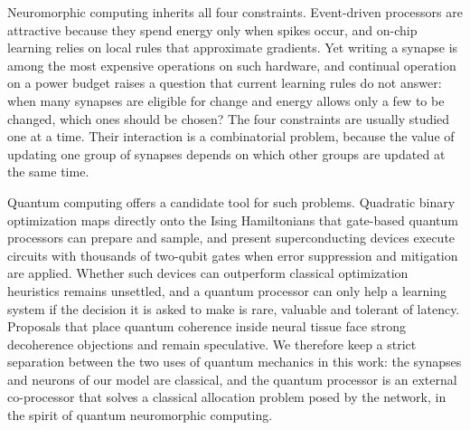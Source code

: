 Neuromorphic computing inherits all four constraints. Event-driven processors are attractive because they spend energy only when spikes occur\cite{roy2019,davies2018}, and on-chip learning relies on local rules that approximate gradients\cite{bellec2020,neftci2019}. Yet writing a synapse is among the most expensive operations on such hardware, and continual operation on a power budget raises a question that current learning rules do not answer: when many synapses are eligible for change and energy allows only a few to be changed, which ones should be chosen? The four constraints are usually studied one at a time. Their interaction is a combinatorial problem, because the value of updating one group of synapses depends on which other groups are updated at the same time.

Quantum computing offers a candidate tool for such problems. Quadratic binary optimization maps directly onto the Ising Hamiltonians that gate-based quantum processors can prepare and sample\cite{lucas2014,farhi2014}, and present superconducting devices execute circuits with thousands of two-qubit gates when error suppression and mitigation are applied\cite{kim2023,ibm2026}. Whether such devices can outperform classical optimization heuristics remains unsettled\cite{abbas2024,koch2026}, and a quantum processor can only help a learning system if the decision it is asked to make is rare, valuable and tolerant of latency. Proposals that place quantum coherence inside neural tissue face strong decoherence objections\cite{tegmark2000} and remain speculative\cite{fisher2015}. We therefore keep a strict separation between the two uses of quantum mechanics in this work: the synapses and neurons of our model are classical, and the quantum processor is an external co-processor that solves a classical allocation problem posed by the network, in the spirit of quantum neuromorphic computing\cite{markovic2020}.

